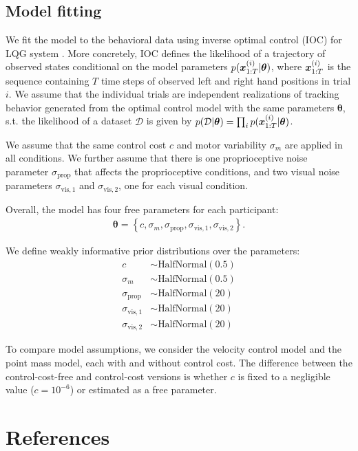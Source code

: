 \documentclass{article}
\begin{document}
\subsection{Model fitting}
We fit the model to the behavioral data using inverse optimal control (IOC) for LQG system \citep{straub2022putting}. More concretely, IOC defines the likelihood of a trajectory of observed states conditional on the model parameters $p({\bm x}_{1:T}^{(i)} \vert \bm \theta)$, where ${\bm x}_{1:T}^{(i)}$ is the sequence containing $T$ time steps of observed left and right hand positions in trial $i$. We assume that the individual trials are independent realizations of tracking behavior generated from the optimal control model with the same parameters $\bm \theta$, s.t. the likelihood of a dataset $\mathcal{D}$ is given by $p(\mathcal{D} \vert \bm \theta) = \prod_i p({\bm x}_{1:T}^{(i)} \vert \bm \theta)$.

We assume that the same control cost $c$ and motor variability $\sigma_m$ are applied in all conditions. 
We further assume that there is one proprioceptive noise parameter $\sigma_\text{prop}$ that affects the proprioceptive conditions, 
and two visual noise parameters $\sigma_{\text{vis},1}$ and $\sigma_{\text{vis},2}$, one for each visual condition. 

Overall, the model has four free parameters for each participant:
\begin{align*}
\bm \theta = \left\{c, \sigma_m, \sigma_\text{prop}, \sigma_{\text{vis},1}, \sigma_{\text{vis},2}\right\}.
\end{align*}

We define weakly informative prior distributions over the parameters:
\begin{align*}
    c &\sim \text{HalfNormal}(0.5) \\
    \sigma_m &\sim \text{HalfNormal}(0.5) \\
    \sigma_\text{prop} &\sim \text{HalfNormal}(20) \\
    \sigma_{\text{vis},1} &\sim \text{HalfNormal}(20) \\
    \sigma_{\text{vis},2} &\sim \text{HalfNormal}(20)
\end{align*}

To compare model assumptions, we consider the velocity control model and the point mass model, each with and without control cost. 
The difference between the control-cost-free and control-cost versions is whether $c$ is fixed to a negligible value ($c = 10^{-6}$) or estimated as a free parameter. 
 

\section*{References}
\printbibliography[heading=none]
\end{document}
